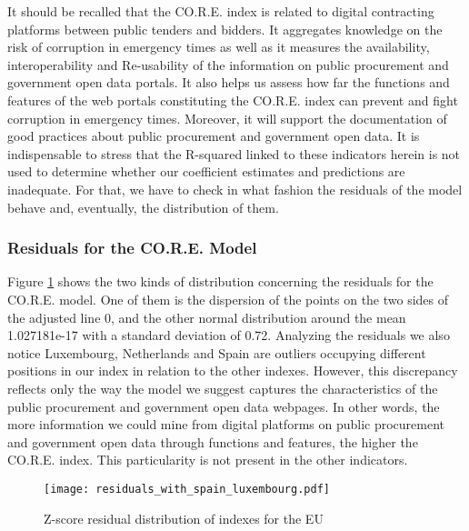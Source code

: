 \documentclass[a4paper, twoside]{report}
\begin{document}
It should be recalled that the CO.R.E. index is related to digital contracting platforms between public tenders and bidders. It aggregates knowledge on the risk of corruption in emergency times as well as it measures the availability, interoperability and Re-usability of the information on public procurement and government open data portals. It also helps us assess how far the functions and features of the web portals constituting the CO.R.E. index can prevent and fight corruption in emergency times. Moreover, it will support the documentation of good practices about public procurement and government open data. It is indispensable to stress that the R-squared linked to these indicators herein is not used to determine whether our coefficient estimates and predictions are inadequate. For that, we have to check in what fashion the residuals of the model behave and, eventually, the distribution of them.\\


\subsubsection{Residuals for the CO.R.E. Model}
\label{residuals_core_model}

Figure \ref{fig:residuals_with_spain_luxembourg} shows the two kinds of distribution concerning the residuals for the CO.R.E. model. One of them is the dispersion of the points on the two sides of the adjusted line 0, and the other normal distribution around the mean 1.027181e-17 with a standard deviation of 0.72. Analyzing the residuals we also notice Luxembourg, Netherlands and Spain are outliers occupying different positions in our index in relation to the other indexes. However, this discrepancy reflects only the way the model we suggest captures the characteristics of the public procurement and government open data webpages. In other words, the more information we could mine from digital platforms on public procurement and government open data through functions and features, the higher the CO.R.E. index. This particularity is not present in the other indicators. \\

\begin{figure}[H]
\centering
	\caption{Z-score residual distribution of indexes for the EU}
	\texttt{[image: residuals\_with\_spain\_luxembourg.pdf]}
	\label{fig:residuals_with_spain_luxembourg}
\end{figure}
\end{document}
